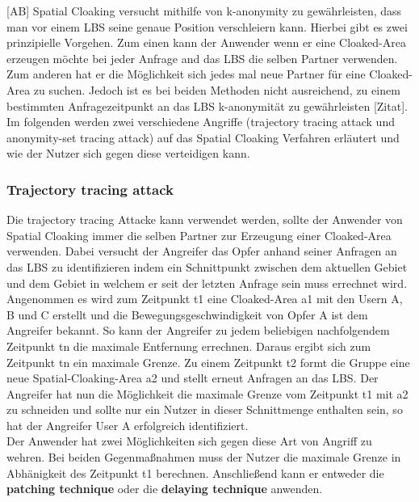 [AB] Spatial Cloaking versucht mithilfe von k-anonymity \cite{Gedik2008} zu gewährleisten, dass man vor einem LBS seine genaue Position verschleiern kann. Hierbei gibt es zwei prinzipielle Vorgehen. Zum einen kann der Anwender wenn er eine Cloaked-Area erzeugen möchte bei jeder Anfrage and das LBS die selben Partner verwenden. Zum anderen hat er die Möglichkeit sich jedes mal neue Partner für eine Cloaked-Area zu suchen. Jedoch ist es bei beiden Methoden nicht ausreichend, zu einem bestimmten Anfragezeitpunkt an das LBS k-anonymität zu gewährleisten [Zitat]. Im folgenden werden zwei verschiedene Angriffe (trajectory tracing attack und anonymity-set tracing attack) auf das Spatial Cloaking Verfahren erläutert und wie der Nutzer sich gegen diese verteidigen kann. 
\subsubsection{Trajectory tracing attack}
Die trajectory tracing Attacke kann verwendet werden, sollte der Anwender von Spatial Cloaking immer die selben Partner zur Erzeugung einer Cloaked-Area verwenden. Dabei versucht der Angreifer das Opfer anhand seiner Anfragen an das LBS zu identifizieren indem ein Schnittpunkt zwischen dem aktuellen Gebiet und dem Gebiet in welchem er seit der letzten Anfrage sein muss errechnet wird. Angenommen es wird zum Zeitpunkt t1 eine Cloaked-Area a1 mit den Usern A, B und C erstellt und die Bewegungsgeschwindigkeit von Opfer A ist dem Angreifer bekannt. So kann der Angreifer zu jedem beliebigen nachfolgendem Zeitpunkt tn die maximale Entfernung errechnen. Daraus ergibt sich zum Zeitpunkt tn ein maximale Grenze. Zu einem Zeitpunkt t2 formt die Gruppe eine neue Spatial-Cloaking-Area a2 und stellt erneut Anfragen an das LBS. Der Angreifer hat nun die Möglichkeit die maximale Grenze vom Zeitpunkt t1 mit a2 zu schneiden und sollte nur ein Nutzer in dieser Schnittmenge enthalten sein, so hat der Angreifer User A erfolgreich identifiziert.\\ 
Der Anwender hat zwei Möglichkeiten sich gegen diese Art von Angriff zu wehren. Bei beiden Gegenmaßnahmen muss der Nutzer die maximale Grenze in Abhänigkeit des Zeitpunkt t1 berechnen. Anschließend kann er entweder die \textbf{patching technique} oder die \textbf{delaying technique} anwenden.

